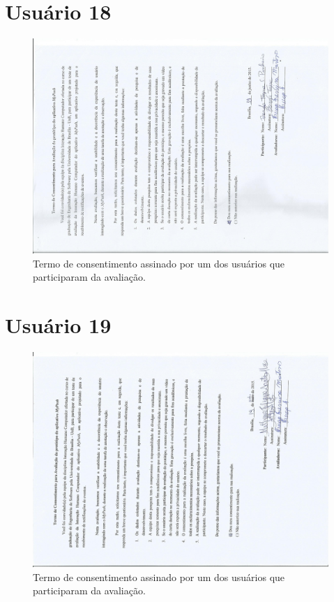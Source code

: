 \begin{anexosenv}
    \section*{Usuário 18}
    \begin{figure}[!htbp]
      \centering
      \includegraphics[scale=0.6, angle=-90]{editaveis/figuras/brenda}
      \caption{Termo de consentimento assinado por um dos usuários que participaram da avaliação.}
      \label{termo_consentimento_1}
    \end{figure}
    
    \section*{Usuário 19}
    \begin{figure}[!htbp]
      \centering
      \includegraphics[scale=0.6, angle=-90]{editaveis/figuras/matheus_filippe}
      \caption{Termo de consentimento assinado por um dos usuários que participaram da avaliação.}
      \label{termo_consentimento_1}
    \end{figure}
    

\end{anexosenv}
